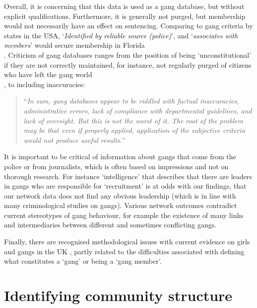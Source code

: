 \documentclass[twocolumn]{svjour3}          %
\theoremstyle{definition}
\begin{document}
Overall, it is concerning that this data is used as a gang database,
but without explicit qualifications. Furthermore, it is generally not
purged, but membership would not necessarily have an effect on
sentencing.  Comparing to gang criteria by states in the USA,
`{\emph{Identified by reliable source (police)}}', and
`{\emph{associates with members}}' would secure membership in
Florida\\\citep{barrows-huff:2009}. Criticism of gang databases ranges
from the position of being `unconstitutional' if they are not
correctly maintained, for instance, not regularly purged of citizens
who have left the gang world\\\citep{jacobs:2009}, to including
inaccuracies:

\begin{quote}
``{\emph{In sum, gang databases appear to be riddled
with factual inaccuracies, administrative errors, lack of compliance
with departmental guidelines, and lack of oversight. But this is not
the worst of it. The root of the problem may be that even if properly
applied, application of the subjective criteria would not produce
useful results.}}''\\ \cite{wright:2005}
\end{quote}

It is important to be critical of information about gangs that come
from the police or from journalists, which is often based on
impressions and not on thorough research. For instance `intelligence'
that describes that there are leaders in gangs who are responsible for
`recruitment' is at odds with our findings, that our network data does
not find any obvious leadership (which is in line with many
criminological studies on gangs). Various network outcomes contradict
current stereotypes of gang behaviour, for example the existence of
many links and intermediaries between different and sometimes
conflicting gangs.

Finally, there are recognised methodological issues with current
evidence on girls and gangs in the UK \citep{batchelor:2009}, partly
related to the difficulties associated with defining what constitutes
a `gang' or being a `gang member'.


\section{Identifying community structure}\label{sec:communitystructure}
\end{document}
